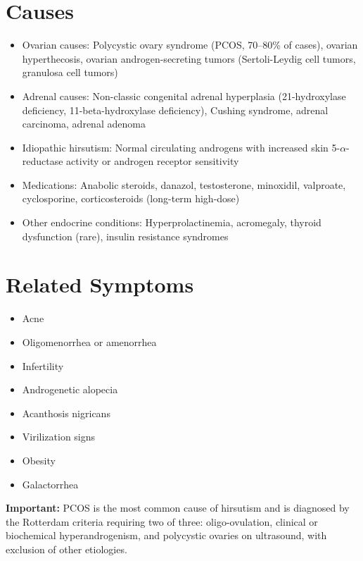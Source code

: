 \section*{Causes}
\begin{itemize}
  \item Ovarian causes: Polycystic ovary syndrome (PCOS, 70--80\% of cases), ovarian hyperthecosis, ovarian androgen-secreting tumors (Sertoli-Leydig cell tumors, granulosa cell tumors)
  \item Adrenal causes: Non-classic congenital adrenal hyperplasia (21-hydroxylase deficiency, 11-beta-hydroxylase deficiency), Cushing syndrome, adrenal carcinoma, adrenal adenoma
  \item Idiopathic hirsutism: Normal circulating androgens with increased skin 5-$\alpha$-reductase activity or androgen receptor sensitivity
  \item Medications: Anabolic steroids, danazol, testosterone, minoxidil, valproate, cyclosporine, corticosteroids (long-term high-dose)
  \item Other endocrine conditions: Hyperprolactinemia, acromegaly, thyroid dysfunction (rare), insulin resistance syndromes
\end{itemize}

\section*{Related Symptoms}
\begin{itemize}
  \item Acne
  \item Oligomenorrhea or amenorrhea
  \item Infertility
  \item Androgenetic alopecia
  \item Acanthosis nigricans
  \item Virilization signs
  \item Obesity
  \item Galactorrhea
\end{itemize}
\textbf{Important:} PCOS is the most common cause of hirsutism and is diagnosed by the Rotterdam criteria requiring two of three: oligo-ovulation, clinical or biochemical hyperandrogenism, and polycystic ovaries on ultrasound, with exclusion of other etiologies.

